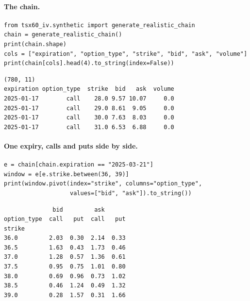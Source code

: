 \paragraph{The chain.}
{\footnotesize
\begin{verbatim}
from tsx60_iv.synthetic import generate_realistic_chain
chain = generate_realistic_chain()
print(chain.shape)
cols = ["expiration", "option_type", "strike", "bid", "ask", "volume"]
print(chain[cols].head(4).to_string(index=False))
\end{verbatim}
\vspace{-0.6em}
\begin{verbatim}
(780, 11)
expiration option_type  strike  bid   ask  volume
2025-01-17        call    28.0 9.57 10.07     0.0
2025-01-17        call    29.0 8.61  9.05     0.0
2025-01-17        call    30.0 7.63  8.03     0.0
2025-01-17        call    31.0 6.53  6.88     0.0
\end{verbatim}
}

\paragraph{One expiry, calls and puts side by side.}
{\footnotesize
\begin{verbatim}
e = chain[chain.expiration == "2025-03-21"]
window = e[e.strike.between(36, 39)]
print(window.pivot(index="strike", columns="option_type",
                   values=["bid", "ask"]).to_string())
\end{verbatim}
\vspace{-0.6em}
\begin{verbatim}
              bid         ask      
option_type  call   put  call   put
strike                             
36.0         2.03  0.30  2.14  0.33
36.5         1.63  0.43  1.73  0.46
37.0         1.28  0.57  1.36  0.61
37.5         0.95  0.75  1.01  0.80
38.0         0.69  0.96  0.73  1.02
38.5         0.46  1.24  0.49  1.32
39.0         0.28  1.57  0.31  1.66
\end{verbatim}
}

